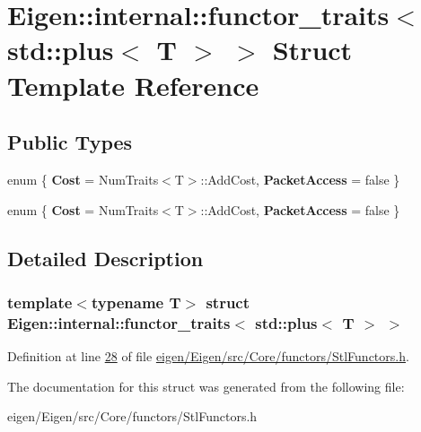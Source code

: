 \hypertarget{struct_eigen_1_1internal_1_1functor__traits_3_01std_1_1plus_3_01_t_01_4_01_4}{}\section{Eigen\+:\+:internal\+:\+:functor\+\_\+traits$<$ std\+:\+:plus$<$ T $>$ $>$ Struct Template Reference}
\label{struct_eigen_1_1internal_1_1functor__traits_3_01std_1_1plus_3_01_t_01_4_01_4}
\subsection*{Public Types}
\begin{DoxyCompactItemize}
\item 
\mbox{\label{struct_eigen_1_1internal_1_1functor__traits_3_01std_1_1plus_3_01_t_01_4_01_4_a9809789475f3cac9ef953eae324fd957}} 
enum \{ {\bfseries Cost} = Num\+Traits$<$T$>$\+:\+:Add\+Cost, 
{\bfseries Packet\+Access} = false
 \}
\item 
\mbox{\label{struct_eigen_1_1internal_1_1functor__traits_3_01std_1_1plus_3_01_t_01_4_01_4_a4084be593c6920be0ebd1d78c9aae024}} 
enum \{ {\bfseries Cost} = Num\+Traits$<$T$>$\+:\+:Add\+Cost, 
{\bfseries Packet\+Access} = false
 \}
\end{DoxyCompactItemize}


\subsection{Detailed Description}
\subsubsection*{template$<$typename T$>$\newline
struct Eigen\+::internal\+::functor\+\_\+traits$<$ std\+::plus$<$ T $>$ $>$}



Definition at line \hyperlink{eigen_2_eigen_2src_2_core_2functors_2_stl_functors_8h_source_l00028}{28} of file \hyperlink{eigen_2_eigen_2src_2_core_2functors_2_stl_functors_8h_source}{eigen/\+Eigen/src/\+Core/functors/\+Stl\+Functors.\+h}.



The documentation for this struct was generated from the following file\+:\begin{DoxyCompactItemize}
\item 
eigen/\+Eigen/src/\+Core/functors/\+Stl\+Functors.\+h\end{DoxyCompactItemize}

